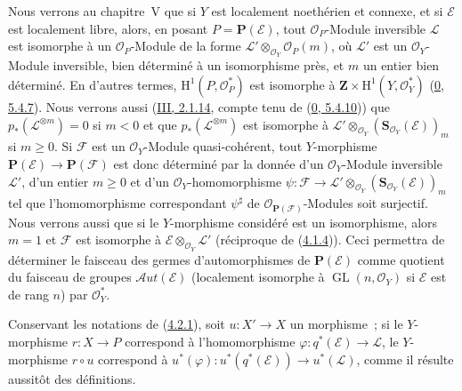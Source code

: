 \begin{remark}[4.2.7]
\label{II.4.2.7-fr}
Nous verrons au chapitre~V que si $Y$ est localement noethérien et connexe,
et si $\mathcal{E}$ est localement libre, alors, en posant
$P=\mathbf{P}(\mathcal{E})$, tout $\mathcal{O}_P$-Module inversible
$\mathcal{L}$ est isomorphe à un $\mathcal{O}_P$-Module de la forme
$\mathcal{L}'\otimes_{\mathcal{O}_Y}\mathcal{O}_P(m)$, où $\mathcal{L}'$ est
un $\mathcal{O}_Y$-Module inversible, bien déterminé à un isomorphisme près,
et $m$ un entier bien déterminé. En d'autres termes,
$\mathrm{H}^1(P,\mathcal{O}_P^*)$ est isomorphe à
$\mathbf{Z}\times\mathrm{H}^1(Y,\mathcal{O}_Y^*)$
(\hyperref[0.5.4.7-fr]{0, 5.4.7}). Nous verrons aussi
(\hyperref[III.2.1.14-fr]{III, 2.1.14}, compte tenu de
(\hyperref[0.5.4.10-fr]{0, 5.4.10})) que
$p_*(\mathcal{L}^{\otimes m})=0$ si $m<0$ et que
$p_*(\mathcal{L}^{\otimes m})$ est isomorphe à
$\mathcal{L}'\otimes_{\mathcal{O}_Y}
(\mathbf{S}_{\mathcal{O}_Y}(\mathcal{E}))_m$ si $m\geq0$. Si $\mathcal{F}$
est un $\mathcal{O}_Y$-Module quasi-cohérent, tout $Y$-morphisme
$\mathbf{P}(\mathcal{E})\to\mathbf{P}(\mathcal{F})$ est donc déterminé par
la donnée d'un $\mathcal{O}_Y$-Module inversible $\mathcal{L}'$, d'un entier
$m\geq0$ et d'un $\mathcal{O}_Y$-homomorphisme
$\psi:\mathcal{F}\to\mathcal{L}'\otimes_{\mathcal{O}_Y}
(\mathbf{S}_{\mathcal{O}_Y}(\mathcal{E}))_m$ tel que l'homomorphisme
correspondant $\psi^\sharp$ de $\mathcal{O}_{\mathbf{P}(\mathcal{F})}$-Modules
soit surjectif. Nous verrons aussi que si le $Y$-morphisme considéré est un
isomorphisme, alors $m=1$ et $\mathcal{F}$ est isomorphe à
$\mathcal{E}\otimes_{\mathcal{O}_Y}\mathcal{L}'$ (réciproque de
(\hyperref[II.4.1.4-fr]{4.1.4})). Ceci permettra de déterminer le faisceau
des germes d'automorphismes de $\mathbf{P}(\mathcal{E})$ comme quotient du
faisceau de groupes $\mathcal{A}ut(\mathcal{E})$ (localement isomorphe à
$\operatorname{GL}(n,\mathcal{O}_Y)$ si $\mathcal{E}$ est de rang $n$) par
$\mathcal{O}_Y^*$.
\end{remark}

\begin{env}[4.2.8]
\label{II.4.2.8-fr}
Conservant les notations de (\hyperref[II.4.2.1-fr]{4.2.1}), soit
$u:X'\to X$ un morphisme~; si le $Y$-morphisme $r:X\to P$ correspond à
l'homomorphisme $\varphi:q^*(\mathcal{E})\to\mathcal{L}$, le $Y$-morphisme
$r\circ u$ correspond à
$u^*(\varphi):u^*(q^*(\mathcal{E}))\to u^*(\mathcal{L})$, comme il résulte
aussitôt des définitions.
\end{env}

